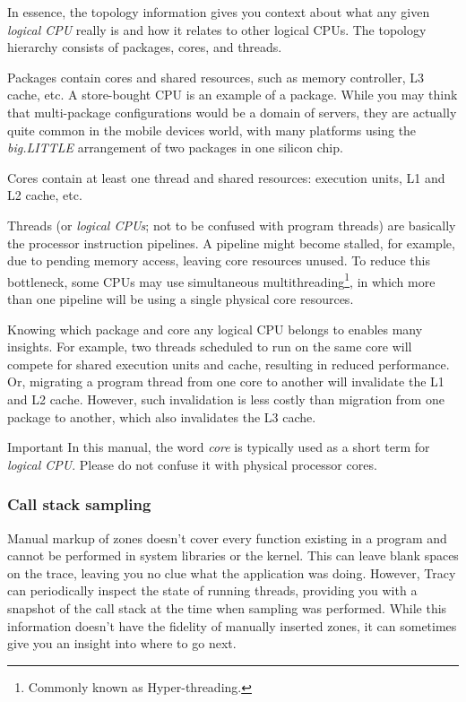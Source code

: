 \documentclass[hidelinks,titlepage,a4paper,twoside]{article}
\begin{document}
In essence, the topology information gives you context about what any given \emph{logical CPU} really is and how it relates to other logical CPUs. The topology hierarchy consists of packages, cores, and threads.

Packages contain cores and shared resources, such as memory controller, L3 cache, etc. A store-bought CPU is an example of a package. While you may think that multi-package configurations would be a domain of servers, they are actually quite common in the mobile devices world, with many platforms using the \emph{big.LITTLE} arrangement of two packages in one silicon chip.

Cores contain at least one thread and shared resources: execution units, L1 and L2 cache, etc.

Threads (or \emph{logical CPUs}; not to be confused with program threads) are basically the processor instruction pipelines. A pipeline might become stalled, for example, due to pending memory access, leaving core resources unused. To reduce this bottleneck, some CPUs may use simultaneous multithreading\footnote{Commonly known as Hyper-threading.}, in which more than one pipeline will be using a single physical core resources.

Knowing which package and core any logical CPU belongs to enables many insights. For example, two threads scheduled to run on the same core will compete for shared execution units and cache, resulting in reduced performance. Or, migrating a program thread from one core to another will invalidate the L1 and L2 cache. However, such invalidation is less costly than migration from one package to another, which also invalidates the L3 cache.

\begin{bclogo}[
noborder=true,
couleur=black!5,
logo=\bcbombe
]{Important}
In this manual, the word \emph{core} is typically used as a short term for \emph{logical CPU}. Please do not confuse it with physical processor cores.
\end{bclogo}

\subsubsection{Call stack sampling}
\label{sampling}

Manual markup of zones doesn't cover every function existing in a program and cannot be performed in system libraries or the kernel. This can leave blank spaces on the trace, leaving you no clue what the application was doing. However, Tracy can periodically inspect the state of running threads, providing you with a snapshot of the call stack at the time when sampling was performed. While this information doesn't have the fidelity of manually inserted zones, it can sometimes give you an insight into where to go next.
\end{document}
